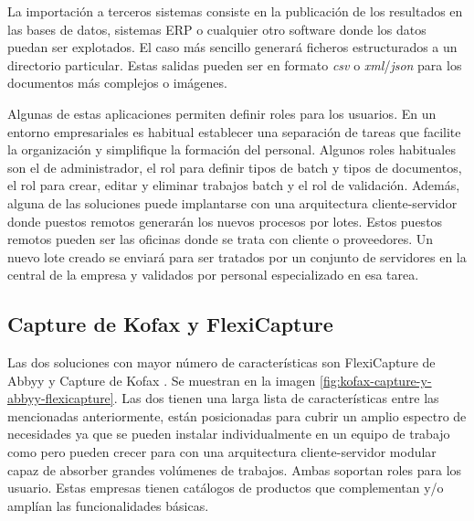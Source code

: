 \begin{itemize}
    La importación a terceros sistemas consiste en la publicación de los resultados en las bases de datos, sistemas ERP o cualquier otro software donde los datos puedan ser explotados. El caso más sencillo generará ficheros estructurados a un directorio particular. Estas salidas pueden ser en formato \emph{\acrlong{csv}} o \emph{\acrlong{xml}}/\emph{\acrlong{json}} para los documentos más complejos o imágenes.
\end{itemize}

Algunas de estas aplicaciones permiten definir roles para los usuarios. En un entorno empresariales es habitual establecer una separación de tareas que facilite la organización y simplifique la formación del personal. Algunos roles habituales son el de administrador, el rol para definir tipos de batch y tipos de documentos, el rol para crear, editar y eliminar trabajos batch y el rol de validación. Además, alguna de las soluciones puede implantarse con una arquitectura cliente-servidor donde puestos remotos generarán los nuevos procesos por lotes. Estos puestos remotos pueden ser las oficinas donde se trata con cliente o proveedores. Un nuevo lote creado se enviará para ser tratados por un conjunto de servidores en la central de la empresa y validados por personal especializado en esa tarea.

\subsection{Capture de Kofax y FlexiCapture}

Las dos soluciones con mayor número de características son FlexiCapture de Abbyy \cite{solucionesComerciales_abbyy_flexicapture4invoices} y Capture de Kofax \cite{solucionesComerciales_kofax_capture}. Se muestran en la imagen \ref{fig:kofax-capture-y-abbyy-flexicapture}. Las dos tienen una larga lista de características entre las mencionadas anteriormente, están posicionadas para cubrir un amplio espectro de necesidades ya que se pueden instalar individualmente en un equipo de trabajo como pero pueden crecer para con una arquitectura cliente-servidor modular capaz de absorber grandes volúmenes de trabajos. Ambas soportan roles para los usuario. Estas empresas tienen catálogos de productos que complementan y/o amplían las funcionalidades básicas.

